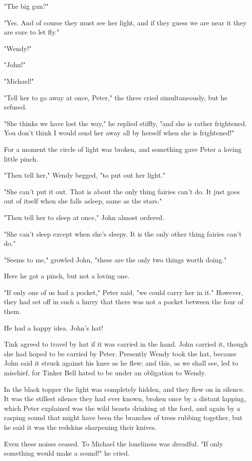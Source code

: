 "The big gun?"


"Yes. And of course they must see her light, and if they guess we are near
it they are sure to let fly."


"Wendy!"


"John!"


"Michael!"


"Tell her to go away at once, Peter," the three cried simultaneously, but
he refused.


"She thinks we have lost the way," he replied stiffly, "and she is rather
frightened. You don't think I would send her away all by herself when she
is frightened!"


For a moment the circle of light was broken, and something gave Peter a
loving little pinch.


"Then tell her," Wendy begged, "to put out her light."


"She can't put it out. That is about the only thing fairies can't do. It
just goes out of itself when she falls asleep, same as the stars."


"Then tell her to sleep at once," John almost ordered.


"She can't sleep except when she's sleepy. It is the only other thing
fairies can't do."


"Seems to me," growled John, "these are the only two things worth doing."


Here he got a pinch, but not a loving one.


"If only one of us had a pocket," Peter said, "we could carry her in it."
However, they had set off in such a hurry that there was not a pocket
between the four of them.


He had a happy idea. John's hat!


Tink agreed to travel by hat if it was carried in the hand. John carried
it, though she had hoped to be carried by Peter. Presently Wendy took the
hat, because John said it struck against his knee as he flew; and this, as
we shall see, led to mischief, for Tinker Bell hated to be under an
obligation to Wendy.


In the black topper the light was completely hidden, and they flew on in
silence. It was the stillest silence they had ever known, broken once by a
distant lapping, which Peter explained was the wild beasts drinking at the
ford, and again by a rasping sound that might have been the branches of
trees rubbing together, but he said it was the redskins sharpening their
knives.


Even these noises ceased. To Michael the loneliness was dreadful. "If only
something would make a sound!" he cried.


